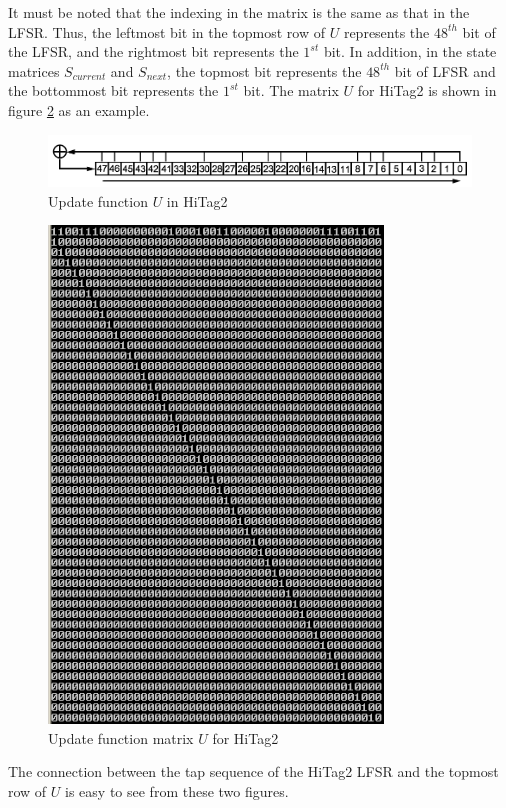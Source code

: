 It must be noted that the indexing in the matrix is the same as that in the LFSR. Thus, the leftmost bit in the topmost row of $U$ represents the $48^{th}$ bit of the LFSR, and the rightmost bit represents the $1^{st}$ bit. In addition, in the state matrices $S_{current}$ and $S_{next}$, the topmost bit represents the $48^{th}$ bit of LFSR and the bottommost bit represents the $1^{st}$ bit. The matrix $U$ for HiTag2 is shown in figure \ref{fig:hitag2-transition-matrix} as an example.
\begin{figure}[h!]
	\centering
	\includegraphics[width=5in]{./figures/hitag2-update-function.png}
	\caption{Update function $U$ in HiTag2}	
	\label{fig:hitag2-update-function}
\end{figure}

\begin{figure}[h!]
	\centering
	\includegraphics[width=3.5in]{./figures/hitag2-transition-matrix.png}
	\caption{Update function matrix $U$ for HiTag2}	
	\label{fig:hitag2-transition-matrix}
\end{figure}

The connection between the tap sequence of the HiTag2 LFSR and the topmost row of $U$ is easy to see from these two figures. 

